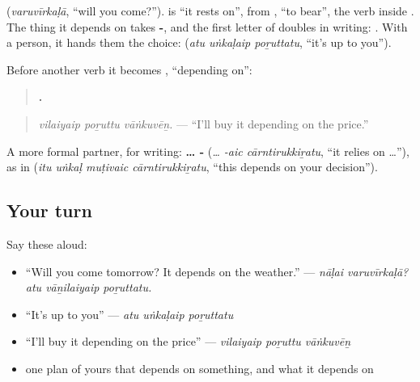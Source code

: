 \textbf{} (\emph{varuvīrkaḷā}, \textquotedblleft{}will you come?\textquotedblright{}). \textbf{} is \textquotedblleft{}it rests on\textquotedblright{}, from \textbf{}, \textquotedblleft{}to bear\textquotedblright{}, the verb inside \textbf{}. The thing it depends on takes \textbf{-}, and the first letter of \textbf{} doubles in writing: \textbf{ }. With a person, it hands them the choice: \textbf{  } (\emph{atu uṅkaḷaip poṟuttatu}, \textquotedblleft{}it's up to you\textquotedblright{}).

Before another verb it becomes \textbf{}, \textquotedblleft{}depending on\textquotedblright{}:

\begin{quote}
\textbf{  .}
\end{quote}

\begin{quote}
\emph{vilaiyaip poṟuttu vāṅkuvēṉ.} — \textquotedblleft{}I'll buy it depending on the price.\textquotedblright{}
\end{quote}

A more formal partner, for writing: \textbf{… - } (\emph{… -aic cārntirukkiṟatu}, \textquotedblleft{}it relies on …\textquotedblright{}), as in \textbf{   } (\emph{itu uṅkaḷ muṭivaic cārntirukkiṟatu}, \textquotedblleft{}this depends on your decision\textquotedblright{}).

\subsection*{Your turn}
Say these aloud:

\begin{itemize}
\raggedright
  \item \textquotedblleft{}Will you come tomorrow? It depends on the weather.\textquotedblright{} — \emph{nāḷai varuvīrkaḷā? atu vāṉilaiyaip poṟuttatu.}
  \item \textquotedblleft{}It's up to you\textquotedblright{} — \emph{atu uṅkaḷaip poṟuttatu}
  \item \textquotedblleft{}I'll buy it depending on the price\textquotedblright{} — \emph{vilaiyaip poṟuttu vāṅkuvēṉ}
  \item one plan of yours that depends on something, and what it depends on
\end{itemize}

